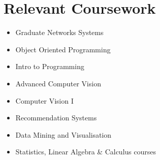 \documentclass[letterpaper,11pt]{article}
\newcommand{\resumeSubHeadingListStart}{\begin{itemize}[leftmargin=0.0in, label={}]}
\newcommand{\resumeSubHeadingListEnd}{\end{itemize}}
\begin{document}
\section{Relevant Coursework}
        \begin{multicols}{2}
            \begin{itemize}[itemsep=-5pt, parsep=3pt]
                \item Graduate Networks Systems
                \item Object Oriented Programming
                \item Intro to Programming
                \item Advanced Computer Vision
                \item Computer Vision I
                \item Recommendation Systems
                \item Data Mining and Visualisation
                \item Statistics, Linear Algebra \& Calculus courses
            \end{itemize}
        \end{multicols}
        \vspace*{2.0\multicolsep}

    
\end{document}
